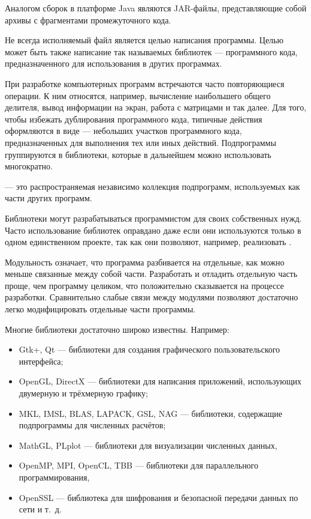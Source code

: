 Аналогом сборок в платформе Java являются JAR-файлы, представляющие
собой архивы с фрагментами промежуточного кода.

Не всегда исполняемый файл является целью написания программы. Целью
может быть также написание так называемых библиотек — программного
кода, предназначенного для использования в других программах.


При разработке компьютерных программ встречаются часто повторяющиеся
операции. К ним относятся, например, вычисление наибольшего общего
делителя, вывод информации на экран, работа с матрицами и так далее.
Для того, чтобы избежать дублирования программного кода, типичные
действия оформляются в виде  —
небольших участков программного кода, предназначенных для выполнения
тех или иных действий.  Подпрограммы группируются в библиотеки,
которые в дальнейшем можно использовать многократно.

\begin{defn}
   — это распространяемая независимо
  коллекция подпрограмм, используемых как части других программ.
\end{defn}

Библиотеки могут разрабатываться программистом для своих собственных
нужд. Часто использование библиотек оправдано даже если они
используются только в одном единственном проекте, так как они
позволяют, например, реализовать .

Модульность означает, что программа разбивается на отдельные, как
можно меньше связанные между собой части. Разработать и отладить
отдельную часть проще, чем программу целиком, что положительно
сказывается на процессе разработки. Сравнительно слабые связи между
модулями позволяют достаточно легко модифицировать отдельные части
программы.


Многие библиотеки достаточно широко известны. Например:
\begin{itemize}
\item Gtk+, Qt — библиотеки для создания графического
  пользовательского интерфейса;
\item OpenGL, DirectX — библиотеки для написания приложений,
  использующих двумерную и трёхмерную графику;
\item MKL, IMSL, BLAS, LAPACK, GSL, NAG — библиотеки, содержащие
  подпрограммы для численных расчётов;
\item MathGL, PLplot — библиотеки для визуализации численных данных,
\item OpenMP, MPI, OpenCL, TBB — библиотеки для параллельного
  программирования,
\item OpenSSL — библиотека для шифрования и безопасной передачи данных
  по сети и т.~д.
\end{itemize}

